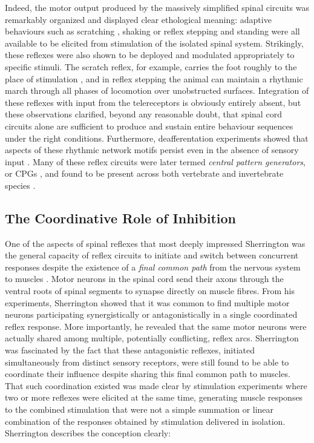 Indeed, the motor output produced by the massively simplified spinal circuits was remarkably organized and displayed clear ethological meaning: adaptive behaviours such as scratching \cite{Sherrington1903}, shaking \cite{Goltz1896, Sherrington1903} or reflex stepping and standing \cite{Sherrington1910, Sherrington1915} were all available to be elicited from stimulation of the isolated spinal system. Strikingly, these reflexes were also shown to be deployed and modulated appropriately to specific stimuli. The scratch reflex, for example, carries the foot roughly to the place of stimulation \cite{Sherrington1904}, and in reflex stepping the animal can maintain a rhythmic march through all phases of locomotion over unobstructed surfaces. Integration of these reflexes with input from the telereceptors is obviously entirely absent, but these observations clarified, beyond any reasonable doubt, that spinal cord circuits alone are sufficient to produce and sustain entire behaviour sequences under the right conditions. Furthermore, deafferentation experiments showed that aspects of these rhythmic network motifs persist even in the absence of sensory input \cite{GrahamBrown1911}. Many of these reflex circuits were later termed \emph{central pattern generators}, or CPGs \cite{Grillner1975, Grillner1981}, and found to be present across both vertebrate and invertebrate species \cite{Orlovsky1999,Selverston2010}.

\subsection{The Coordinative Role of Inhibition}

One of the aspects of spinal reflexes that most deeply impressed Sherrington was the general capacity of reflex circuits to initiate and switch between concurrent responses despite the existence of a \emph{final common path} from the nervous system to muscles \cite{Sherrington1904}. Motor neurons in the spinal cord send their axons through the ventral roots of spinal segments to synapse directly on muscle fibres. From his experiments, Sherrington showed that it was common to find multiple motor neurons participating synergistically or antagonistically in a single coordinated reflex response. More importantly, he revealed that the same motor neurons were actually shared among multiple, potentially conflicting, reflex arcs. Sherrington was fascinated by the fact that these antagonistic reflexes, initiated simultaneously from distinct sensory receptors, were still found to be able to coordinate their influence despite sharing this final common path to muscles. That such coordination existed was made clear by stimulation experiments where two or more reflexes were elicited at the same time, generating muscle responses to the combined stimulation that were not a simple summation or linear combination of the responses obtained by stimulation delivered in isolation. Sherrington describes the conception clearly:

